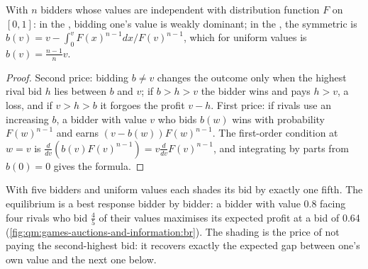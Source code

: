 \begin{proposition}\label{prop:qm:games-auctions-and-information:bids}
With $n$ bidders whose values are independent with distribution function $F$ on $[0, 1]$: in the , bidding one's value is weakly dominant; in the , the symmetric  is $b(v) = v - \int_0^vF(x)^{n-1}dx/F(v)^{n-1}$, which for uniform values is $b(v) = \frac{n-1}nv$.
\end{proposition}

\begin{proof}
Second price: bidding $b \ne v$ changes the outcome only when the highest rival bid $h$ lies between $b$ and $v$; if $b > h > v$ the bidder wins and pays $h > v$, a loss, and if $v > h > b$ it forgoes the
profit $v - h$. First price: if rivals use an increasing $b$, a bidder with value $v$ who bids $b(w)$ wins with probability $F(w)^{n-1}$ and earns $(v - b(w))F(w)^{n-1}$. The first-order condition at $w = v$ is
$\frac{d}{dv}(b(v)F(v)^{n-1}) = v\frac{d}{dv}F(v)^{n-1}$, and integrating by parts from $b(0) = 0$ gives the formula.
\end{proof}

With five bidders and uniform values each shades its bid by exactly one fifth. The equilibrium is a best response bidder by bidder: a bidder with value 0.8 facing four rivals who bid $\frac45$ of their values
maximises its expected profit at a bid of 0.64 (\cref{fig:qm:games-auctions-and-information:br}). The shading is the price of not paying the second-highest bid: it recovers exactly the expected gap between
one's own value and the next one below.

\begin{omfigure}

\label{fig:qm:games-auctions-and-information:br}
\end{omfigure}

